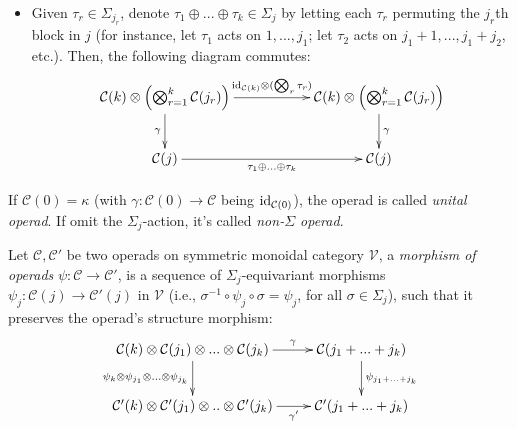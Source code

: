 \documentclass{article}
\begin{document}
\begin{defn}
\begin{itemize}
\begin{itemize}
        \begin{exmp}
            Given $j=5=2+3$, the permutation $(1\ 2)\in \Sigma_2$, $\sigma(2,3)$ is the permutation $\langle 1,2;3,4,5 \rangle \mapsto \langle 3,4,5;1,2\rangle$ (namely changing the blocks' order, without changing the order in each block).
        \end{exmp} 
        Then, the following diagram commutes:
        \[\xymatrix{
            \mathcal{C}(k)\tensor \left(\bigtensor_{r=1}^k \mathcal{C}(j_r)\right) \ar[d]_-{\gamma} \ar[rr]^-{\sigma\tensor \text{ shuffle}_{\sigma^{-1}}} && \mathcal{C}(k)\tensor \left(\bigtensor_{r=1}^k \mathcal{C}(j_{\sigma(r)})\right) \ar[d]^-{\gamma}\\
            \mathcal{C}(j) \ar[rr]_-{\sigma(j_{\sigma(1)},...,j_{\sigma(k)})} && \mathcal{C}(j)
        }\]
        \item Given $\tau_r\in \Sigma_{j_r}$, denote $\tau_1\oplus ... \oplus \tau_k\in \Sigma_j$ by letting each $\tau_r$ permuting the $j_r$th block in $j$ (for instance, let $\tau_1$ acts on $1,...,j_1$; let $\tau_2$ acts on $j_1+1,...,j_1+j_2$, etc.). Then, the following diagram commutes:
        \[\xymatrix{
            \mathcal{C}(k)\tensor \left(\bigtensor_{r=1}^k \mathcal{C}(j_r)\right)\ar[d]_-{\gamma} \ar[rr]^-{\id_{\mathcal{C}(k)}\tensor (\bigtensor_r \tau_r)} && \mathcal{C}(k)\tensor \left(\bigtensor_{r=1}^k \mathcal{C}(j_r)\right) \ar[d]^-{\gamma}\\
            \mathcal{C}(j) \ar[rr]_{\tau_1\oplus...\oplus\tau_k} && \mathcal{C}(j)
        }\]
    \end{itemize}
\end{itemize}

If $\mathcal{C}(0)=\kappa$ (with $\gamma:\mathcal{C}(0)\rightarrow \mathcal{C}$ being $\mathrm{id}_{\mathcal{C}(0)}$), the operad is called \emph{unital operad}. If omit the $\Sigma_j$-action, it's called \emph{non-$\Sigma$ operad}.
\end{defn}

\begin{defn}
    Let $\mathcal{C},\mathcal{C}'$ be two operads on symmetric monoidal category $\mathcal{V}$, a \emph{morphism of operads} $\psi:\mathcal{C}\rightarrow \mathcal{C}'$, is a sequence of $\Sigma_j$-equivariant morphisms $\psi_j:\mathcal{C}(j)\rightarrow \mathcal{C}'(j)$ in $\mathcal{V}$ (i.e., $\sigma^{-1}\circ \psi_j\circ \sigma = \psi_j$, for all $\sigma\in \Sigma_j$), such that it preserves the operad's structure morphism:
    \[\xymatrix{
        \mathcal{C}(k)\tensor \mathcal{C}(j_1)\tensor...\tensor \mathcal{C}(j_k) \ar[d]_-{\psi_k\tensor \psi_{j_1}\tensor...\tensor \psi_{j_k}} \ar[r]^-{\gamma} & \mathcal{C}(j_1+...+j_k) \ar[d]^-{\psi_{j_1+...+j_k}}\\
        \mathcal{C}'(k)\tensor \mathcal{C}'(j_1)\tensor ..\tensor \mathcal{C}'(j_k) \ar[r]_-{\gamma'} & \mathcal{C}'(j_1+...+j_k)
    }\]
\end{defn}
\end{document}
